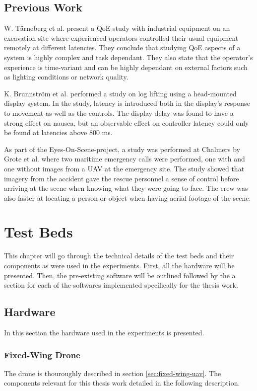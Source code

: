 \documentclass[nofilelist]{cslthse-msc}
\begin{document}
\section{Previous Work}

W. Tärneberg et al. \cite{industry4.0} present a QoE study with industrial equipment on an excavation site where experienced operators controlled their usual equipment remotely at different latencies. They conclude that studying QoE aspects of a system is highly complex and task dependant. They also state that the operator's experience is time-variant and can be highly dependant on external factors such as lighting conditions or network quality.

K. Brunnström et al. \cite{latency-impact} performed a study on log lifting using a head-mounted display system. In the study, latency is introduced both in the display's response to movement as well as the controls. The display delay was found to have a strong effect on nausea, but an observable effect on controller latency could only be found at latencies above 800 ms. 

As part of the Eyes-On-Scene-project, a study was performed at Chalmers by Grote et al. \cite{eos-maritime} where two maritime emergency calls were performed, one with and one without images from a UAV at the emergency site. The study showed that imagery from the accident gave the rescue personnel a sense of control before arriving at the scene when knowing what they were going to face. The crew was also faster at locating a person or object when having aerial footage of the scene.

\chapter{Test Beds}
This chapter will go through the technical details of the test beds and their components as were used in the experiments. First, all the hardware will be presented. Then, the pre-existing software will be outlined followed by the a section for each of the softwares implemented specifically for the thesis work.

\section{Hardware}
In this section the hardware used in the experiments is presented.

\subsection{Fixed-Wing Drone}
\label{sec:uav-components}
The drone is thouroughly described in section \ref{sec:fixed-wing-uav}. The components relevant for this thesis work detailed in the following description.
\end{document}
